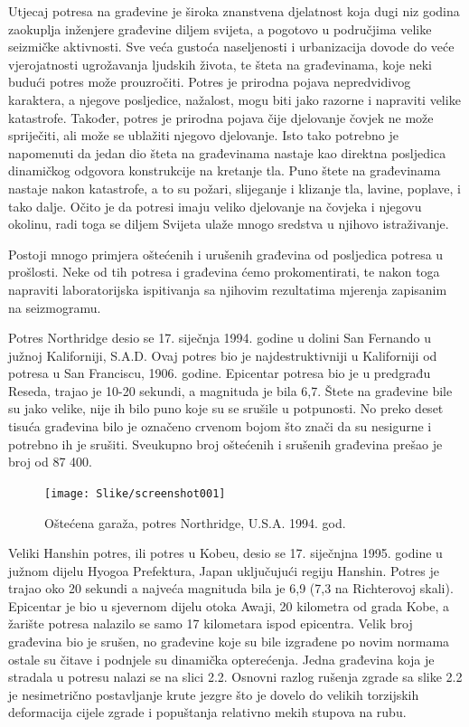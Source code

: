 \documentclass[12pt]{book}
\begin{document}
Utjecaj potresa na građevine je široka znanstvena djelatnost koja dugi niz godina zaokuplja inženjere građevine diljem svijeta, a pogotovo u područjima velike seizmičke aktivnosti. Sve veća gustoća naseljenosti i urbanizacija dovode do veće vjerojatnosti  ugrožavanja ljudskih života, te šteta na građevinama, koje neki budući potres može prouzročiti. Potres je prirodna pojava nepredvidivog karaktera, a njegove posljedice, nažalost, mogu biti jako razorne i napraviti velike katastrofe. Također, potres je prirodna pojava čije djelovanje čovjek ne može spriječiti, ali može se ublažiti njegovo djelovanje. Isto tako potrebno je napomenuti da jedan dio šteta na građevinama nastaje kao direktna posljedica dinamičkog odgovora konstrukcije na kretanje tla. Puno štete na građevinama nastaje nakon katastrofe, a to su požari, slijeganje i klizanje tla, lavine, poplave, i tako dalje. Očito je da potresi imaju veliko djelovanje na čovjeka i njegovu okolinu, radi toga se diljem Svijeta ulaže mnogo sredstva u njihovo istraživanje. \cite{hrasnica2005}

Postoji mnogo primjera oštećenih i urušenih građevina od posljedica potresa u prošlosti. Neke od tih potresa i građevina ćemo prokomentirati, te nakon toga napraviti laboratorijska ispitivanja sa njihovim rezultatima mjerenja zapisanim na seizmogramu. \cite{hrasnica2005}

Potres Northridge desio se 17. siječnja 1994. godine u dolini San Fernando u južnoj Kaliforniji, S.A.D. Ovaj potres bio je najdestruktivniji u Kaliforniji od potresa u San Franciscu, 1906. godine. Epicentar potresa bio je u predgrađu Reseda, trajao je 10-20 sekundi, a magnituda je bila 6,7. Štete na građevine bile su jako velike, nije ih bilo puno koje su se srušile u potpunosti. No preko deset tisuća građevina bilo je označeno crvenom bojom što znači da su nesigurne i potrebno ih je srušiti. Sveukupno broj oštećenih i srušenih građevina prešao je broj od 87 400. \cite{britannica_northridge}

\begin{figure}[h]
	\centering
	\texttt{[image: Slike/screenshot001]}
	\caption{Oštećena garaža, potres Northridge, U.S.A. 1994. god. \cite{northridge_slika}}
	\label{fig:screenshot001}
\end{figure}

\newpage

Veliki Hanshin potres, ili potres u Kobeu, desio se 17. siječnjna 1995. godine u južnom dijelu Hyogoa Prefektura, Japan uključujući regiju Hanshin. Potres je trajao oko 20 sekundi a najveća magnituda bila je 6,9 (7,3 na Richterovoj skali). Epicentar je bio u sjevernom dijelu otoka Awaji, 20 kilometra od grada Kobe, a žarište potresa nalazilo se samo 17 kilometara ispod epicentra. Velik broj građevina bio je srušen, no građevine koje su bile izgrađene po novim normama ostale su čitave i podnjele su dinamička opterećenja. \cite{britannica_kobe} Jedna građevina koja je stradala u potresu nalazi se na slici 2.2. Osnovni razlog rušenja zgrade sa slike 2.2 je nesimetrično postavljanje krute jezgre što je dovelo do velikih torzijskih deformacija cijele zgrade i popuštanja relativno mekih stupova na rubu. \cite{hrasnica2005}
\end{document}
